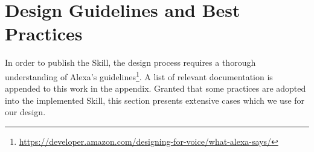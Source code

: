 %
%
%
%
%
%
%
%
%
%
%
%
%
%
%
%
%
%





\section{Design Guidelines and Best Practices}
\label{designGuide}


In order to publish the Skill, the design process requires a thorough understanding of Alexa's guidelines\footnote{ {\url{https://developer.amazon.com/designing-for-voice/what-alexa-says/}}}. A list of relevant documentation is appended to this work in the appendix. Granted that some practices are adopted into the implemented Skill, this section presents extensive cases which we use for our design.\\
%




